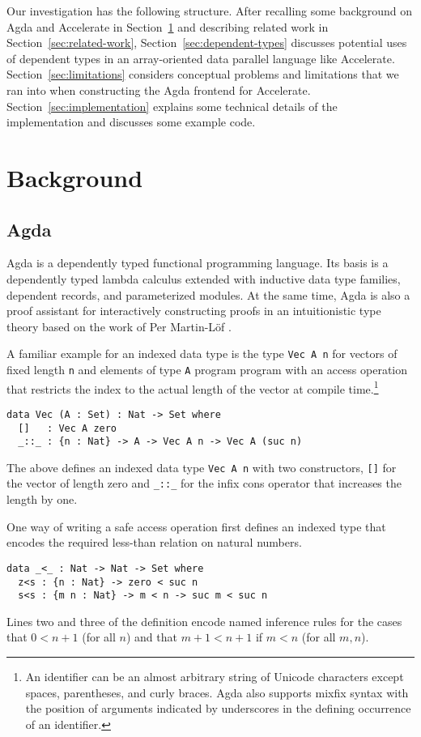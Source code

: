 \documentclass{llncs}
\begin{document}
Our investigation has the following structure. After recalling some
background on Agda and Accelerate in Section~\ref{sec:background} and
describing related work in Section~\ref{sec:related-work}, 
Section~\ref{sec:dependent-types} discusses potential uses of
dependent types in an array-oriented data parallel language like
Accelerate. Section~\ref{sec:limitations} considers conceptual
problems and limitations that we ran into when constructing the Agda
frontend for Accelerate. Section~\ref{sec:implementation} explains
some technical details of the implementation and discusses some
example code. 

\section{Background}
\label{sec:background}

\subsection{Agda}
\label{sec:agda}

Agda \cite{Norell2008,BoveDybjerNorell2009} is a dependently typed
functional programming language. Its basis is a dependently typed
lambda calculus extended with inductive data type families, dependent
records, and parameterized modules. At the same time, Agda is also a
proof assistant for interactively constructing proofs in an
intuitionistic type theory based on the work of Per Martin-L\"of
\cite{MartinLoef1984}. 

A familiar example for an indexed data type is the type
\verb+Vec A n+ for vectors of fixed length \verb+n+ and elements of
type \verb+A+ program program with an access operation that restricts the index to the
actual length of the vector at compile time.\footnote{An
  identifier can be an almost arbitrary 
  string of Unicode characters except spaces, parentheses, and curly
  braces. Agda also supports mixfix syntax with the position of
  arguments indicated by underscores in the defining occurrence of an
  identifier.} 
\begin{verbatim}
data Vec (A : Set) : Nat -> Set where
  []   : Vec A zero
  _::_ : {n : Nat} -> A -> Vec A n -> Vec A (suc n)
\end{verbatim}
The above defines an indexed data type \verb+Vec A n+ with two
constructors, \verb+[]+ for the vector of length zero and 
\verb+_::_+ for the infix cons operator that increases the length by one.

One way of writing a safe access operation first defines an indexed
type that encodes the required less-than relation on natural numbers.
\begin{verbatim}
data _<_ : Nat -> Nat -> Set where
  z<s : {n : Nat} -> zero < suc n
  s<s : {m n : Nat} -> m < n -> suc m < suc n
\end{verbatim}
Lines two and three of the definition encode named inference rules for
the cases that $0 < n+1$ (for all $n$) and that $m+1 < n+1$ if $m < n$
(for all $m,n$).
\end{document}

